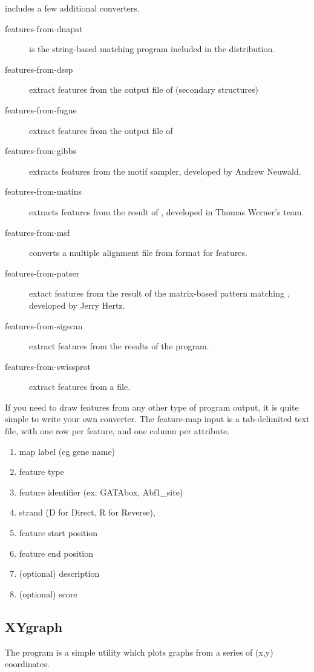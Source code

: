 \RSAT includes a few additional converters.

\begin{description}

\item[features-from-dnapat]  is the string-based 
matching program included in the  \RSAT distribution. 

\item[features-from-dssp] extract features from the output file of
 (secondary structures)

\item[features-from-fugue] extract features from the output file of

\item[features-from-gibbs] extracts features from the  
motif sampler, developed by Andrew Neuwald. 

\item[features-from-matins] extracts features from the result of 
, developed in Thomas Werner's team. 

\item[features-from-msf] converts a multiple alignment file from 
format  for features. 

\item[features-from-patser] extact features from the result of the 
matrix-based pattern matching , developed by Jerry Hertz. 

\item[features-from-sigscan] extract features from the results of the
 program. 

\item[features-from-swissprot] extract features from a  file. 

\end{description}


If you need to draw features from any other type of program 
output, it is quite simple to write your own converter. The feature-map 
input is a tab-delimited text file, with one row per feature, and 
one column per attribute. 

\begin{enumerate}
\item map label (eg gene name)
\item feature type
\item feature identifier (ex: GATAbox, Abf1\_site)
\item strand (D for Direct, R for Reverse),
\item feature start position
\item feature end position
\item (optional) description 
\item (optional) score
\end{enumerate}

\subsection{XYgraph}

The program  is a simple utility which plots graphs
from a series of (x,y) coordinates.
